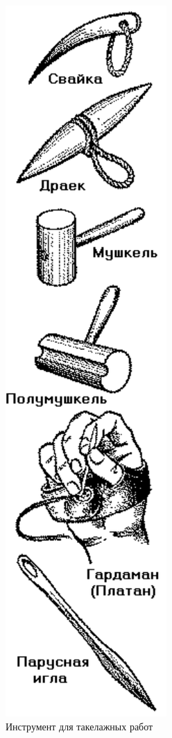 \documentclass[a4paper, 12pt, twoside, final]{scrbook}
\begin{document}
\begin{figure}
   \centering
   \includegraphics{pics/58_Instrument_takelazh_rabot} %
   \caption{Инструмент для такелажных работ}
   \label{fig:58}
\end{figure}
\end{document}

